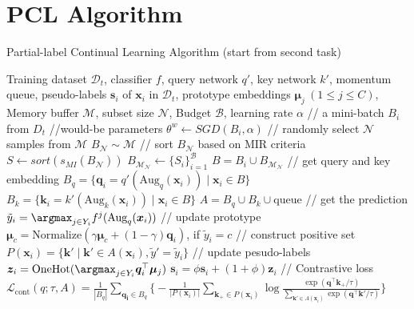 \documentclass{article} %
\begin{document}
\section{PCL Algorithm}
\begin{algorithm}[ht!]
    \renewcommand{\algorithmicrequire}{\textbf{Input:}}
    \caption{Partial-label Continual Learning Algorithm (start from second task)}
    \begin{algorithmic}[1]
        \Require Training dataset $\mathcal{D}_t$, classifier $f$, query network $q'$, key network $k'$, momentum queue, pseudo-labels $\boldsymbol{s}_i$ of $\boldsymbol{x}_i$ in $\mathcal{D}_t$, prototype embeddings $\boldsymbol{\mu}_j ~ (1 \le j \le C)$, Memory buffer $\mathcal{M}$, subset size $\mathcal{N}$, Budget $\mathcal{B}$, learning rate $\alpha$
                \State // a mini-batch $B_i$ from $D_t$
                \State //would-be parameters
                \State $\theta^w \leftarrow SGD(B_i, \alpha)$
                \State // randomly select $\mathcal{N}$ samples from $\mathcal{M}$
                \State $B_\mathcal{N} \sim \mathcal{M}$
                \State // sort $B_\mathcal{N}$ based on MIR criteria
                \State $S \leftarrow sort(s_{MI}(B_\mathcal{N}))$
                \State $B_{\mathcal{M}_\mathcal{N}} \leftarrow \{S_i\}^\mathcal{B}_{i=1}$ 
                \State $B = B_i \cup B_{\mathcal{M}_\mathcal{N}}$
                \State // get query and key embedding
                \State $B_q = \{\boldsymbol{q}_i = q'(\text{Aug}_q(\boldsymbol{x}_i)) \mid \boldsymbol{x}_i \in B\}$
                \State $B_k = \{\boldsymbol{k}_i = k'(\text{Aug}_k(\boldsymbol{x}_i)) \mid \boldsymbol{x}_i \in B\}$
                \State $A = B_q \cup B_k \cup \text{queue}$
                    \State // get the prediction 
                    \State $\tilde{y}_i = \argmax_{j\in Y_i} f^j(\text{Aug}_q(\boldsymbol{x}_i))$
                    \State // update prototype
                    \State $\boldsymbol{\mu}_c = \text{Normalize}(\gamma\boldsymbol{\mu}_c + (1-\gamma)\boldsymbol{q}_i)$, if $\tilde{y}_i = c$
                    \State // construct positive set
                    \State $P(\boldsymbol{x}_i) = \{ \boldsymbol{k}' \mid \boldsymbol{k}' \in A(\boldsymbol{x}_i), \tilde{y}' = \tilde{y}_i \}$
                \EndFor
                \State // update pesudo-labels
                    \State $\boldsymbol{z}_i = \text{OneHot}(\argmax_{j \in Y_i}\boldsymbol{q}_i^\top\boldsymbol{\mu}_j)$
                    \State $\boldsymbol{s}_i = \phi \boldsymbol{s}_i + (1 + \phi)\boldsymbol{z}_i$
                \EndFor
                \State // Contrastive loss
                \State $\mathcal{L}_{\text{cont}}(q;\tau, A) = \frac{1}{|B_q|}\sum_{\boldsymbol{q_i}\in B_q}\Big \{-\frac{1}{|P(\boldsymbol{x}_i)|} \sum_{\boldsymbol{k}_+\in P(\boldsymbol{x}_i)}\log \frac{\exp(\boldsymbol{q}^\top\boldsymbol{k}_+ / \tau)}{\sum_{\boldsymbol{k}'\in A(\boldsymbol{x}_i)}\exp(\boldsymbol{q}^\top \boldsymbol{k}' / \tau)}\Big \}$


\end{algorithmic}
\end{algorithm}
\end{document}
